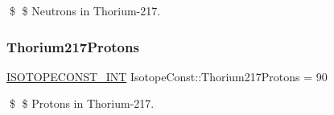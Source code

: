 \$ \$ Neutrons in Thorium-\/217. \mbox{\label{group___isotope_const-_thorium-_th217_ga310393b58364a1cff0589698ed0c1261}} 
\subsubsection{\texorpdfstring{Thorium217\+Protons}{Thorium217Protons}}
{\footnotesize\ttfamily \mbox{\hyperlink{group___isotope_const-_macros_ga5f18360b3e99483a35c32d789e62621c}{I\+S\+O\+T\+O\+P\+E\+C\+O\+N\+S\+T\+\_\+\+I\+NT}} Isotope\+Const\+::\+Thorium217\+Protons = 90}

\$ \$ Protons in Thorium-\/217. 